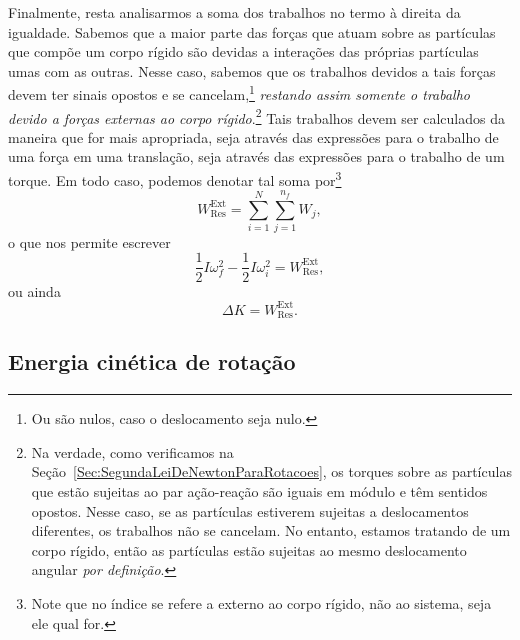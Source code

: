 Finalmente, resta analisarmos a soma dos trabalhos no termo à direita da igualdade. Sabemos que a maior parte das forças que atuam sobre as partículas que compõe um corpo rígido são devidas a interações das próprias partículas umas com as outras. Nesse caso, sabemos que os trabalhos devidos a tais forças devem ter sinais opostos e se cancelam,\footnote{Ou são nulos, caso o deslocamento seja nulo.} \emph{restando assim somente o trabalho devido a forças externas ao corpo rígido}.\footnote{Na verdade, como verificamos na Seção~\ref{Sec:SegundaLeiDeNewtonParaRotacoes}, os torques sobre as partículas que estão sujeitas ao par ação-reação são iguais em módulo e têm sentidos opostos. Nesse caso, se as partículas estiverem sujeitas a deslocamentos diferentes, os trabalhos não se cancelam. No entanto, estamos tratando de um corpo rígido, então as partículas estão sujeitas ao mesmo deslocamento angular \emph{por definição}.} Tais trabalhos devem ser calculados da maneira que for mais apropriada, seja através das expressões para o trabalho de uma força em uma translação, seja através das expressões para o trabalho de um torque. Em todo caso, podemos denotar tal soma por\footnote{Note que no índice se refere a externo ao corpo rígido, não ao sistema, seja ele qual for.}
\begin{equation}
    W_{\text{Res}}^{\text{Ext}} = \sum_{i = 1}^N\sum_{j=1}^{n_f} W_j,
\end{equation}
%
o que nos permite escrever
\begin{equation}
    \frac{1}{2}I\omega_f^2 - \frac{1}{2}I\omega_i^2 = W_{\text{Res}}^{\text{Ext}},
\end{equation}
%
ou ainda
\begin{equation}
    \Delta K = W_{\text{Res}}^{\text{Ext}}.
\end{equation}

\subsection{Energia cinética de rotação}

